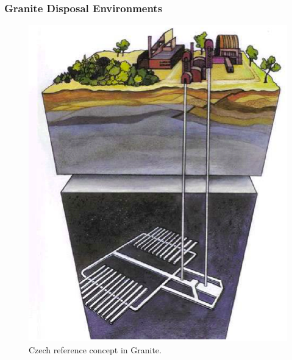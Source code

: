 \begin{frame}[ctb!]
  \frametitle{Granite Disposal Environments}

  \begin{figure}[h!]
    \begin{center}
      \includegraphics[height=.7\textheight]{czechGraniteRedImp.eps}
    \end{center}
    \caption{Czech reference concept in Granite.\cite{von_lensa_red-impact_2005}}
    \label{fig:czechGraniteRedImp}
  \end{figure}
\end{frame}

